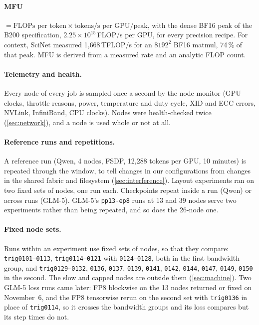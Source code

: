 \paragraph{MFU} $= \text{FLOPs per token} \times \text{tokens/s per GPU} / \text{peak}$, with the dense
BF16 peak of the B200 specification, $2.25\times10^{15}$\,FLOP/s per GPU, for every precision recipe. For
context, SciNet measured 1{,}668\,TFLOP/s for an $8192^2$ BF16 matmul, 74\,\% of that peak. MFU is
derived from a measured rate and an analytic FLOP count.

\paragraph{Telemetry and health.} Every node of every job is sampled once a second by the node monitor
(GPU clocks, throttle reasons, power, temperature and duty cycle, XID and ECC errors, NVLink, InfiniBand,
CPU clocks). Nodes were health-checked twice (\cref{sec:network}), and a node is used whole or not at all.

\paragraph{Reference runs and repetitions.} A reference run (Qwen, 4 nodes, FSDP, 12{,}288 tokens per GPU, 10 minutes) is repeated through the window, to tell changes in our configurations from changes in the shared fabric and filesystem (\cref{sec:interference}). Layout experiments ran on two fixed sets of nodes, one run each. Checkpoints repeat inside a run (Qwen) or across runs (GLM-5). GLM-5's \texttt{pp13-ep8} runs at 13 and 39 nodes serve two experiments rather than being repeated, and so does the 26-node one.

\paragraph{Fixed node sets.} Runs within an experiment use fixed sets of nodes, so that they compare: \texttt{trig0101--0113}, \texttt{trig0114--0121} with \texttt{0124--0128}, both in the first bandwidth group, and \texttt{trig0129--0132}, \texttt{0136}, \texttt{0137}, \texttt{0139}, \texttt{0141}, \texttt{0142}, \texttt{0144}, \texttt{0147}, \texttt{0149}, \texttt{0150} in the second. The slow and capped nodes are outside them (\cref{sec:machine}). Two GLM-5 loss runs came later: FP8 blockwise on the 13 nodes returned or fixed on November~6, and the FP8 tensorwise rerun on the second set with \texttt{trig0136} in place of \texttt{trig0114}, so it crosses the bandwidth groups and its loss compares but its step times do not.

